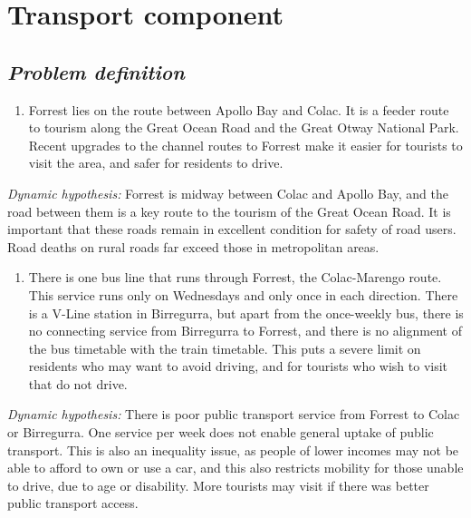\documentclass[
  11pt,
]{book}
\providecommand{\tightlist}{%
  \setlength{\itemsep}{0pt}\setlength{\parskip}{0pt}}
\begin{document}
\hypertarget{transport-component}{%
\chapter{Transport component}\label{transport-component}}

\hypertarget{problem-definition-11}{%
\section{\texorpdfstring{\emph{Problem definition}}{Problem definition}}\label{problem-definition-11}}

\begin{enumerate}
\def\labelenumi{\arabic{enumi}.}
\tightlist
\item
  Forrest lies on the route between Apollo Bay and Colac. It is a feeder route to tourism along the Great Ocean Road and the Great Otway National Park. Recent upgrades to the channel routes to Forrest make it easier for tourists to visit the area, and safer for residents to drive.
\end{enumerate}

\emph{Dynamic hypothesis:}
Forrest is midway between Colac and Apollo Bay, and the road between them is a key route to the tourism of the Great Ocean Road. It is important that these roads remain in excellent condition for safety of road users. Road deaths on rural roads far exceed those in metropolitan areas.

\begin{enumerate}
\def\labelenumi{\arabic{enumi}.}
\setcounter{enumi}{1}
\tightlist
\item
  There is one bus line that runs through Forrest, the Colac-Marengo route. This service runs only on Wednesdays and only once in each direction. There is a V-Line station in Birregurra, but apart from the once-weekly bus, there is no connecting service from Birregurra to Forrest, and there is no alignment of the bus timetable with the train timetable. This puts a severe limit on residents who may want to avoid driving, and for tourists who wish to visit that do not drive.
\end{enumerate}

\emph{Dynamic hypothesis:}
There is poor public transport service from Forrest to Colac or Birregurra. One service per week does not enable general uptake of public transport. This is also an inequality issue, as people of lower incomes may not be able to afford to own or use a car, and this also restricts mobility for those unable to drive, due to age or disability. More tourists may visit if there was better public transport access.
\end{document}
